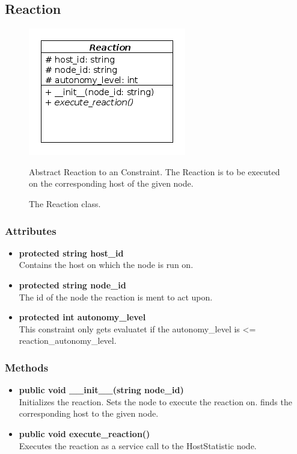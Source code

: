 \subsection{Reaction}
\begin{figure}[htbp]
	\begin{minipage}[t]{8cm}
		\vspace{0pt}
		\centering
		\includegraphics[scale=0.6]{./diagram_pictures/reactor/Reaction.png}
		\caption{The Reaction class.}
	\end{minipage}
	\hfill
	\begin{minipage}[t]{8cm}
		\vspace{10pt}
			Abstract Reaction to an Constraint. The Reaction is to be executed on the corresponding host of the given node.
	\end{minipage}
\end{figure}  

\subsubsection{Attributes}
\begin{itemize}
	\item \textbf{ protected string host\_id }\\
		Contains the host on which the node is run on.
	\item \textbf{ protected string node\_id }\\
		The id of the node the reaction is ment to act upon.
	\item \textbf{ protected int autonomy\_level }\\
		This constraint only gets evaluatet if 
		the autonomy\_level is <= reaction\_autonomy\_level.
\end{itemize}
\subsubsection{Methods}
\begin{itemize}
	\item \textbf{ public void \_\_init\_\_(string node\_id) }\\
		Initializes the reaction. Sets the node to execute the reaction on. finds the corresponding host to the given node.
	\item \textbf{ public void execute\_reaction() }\\
		Executes the reaction as a service call to the HostStatistic node.
\end{itemize}

